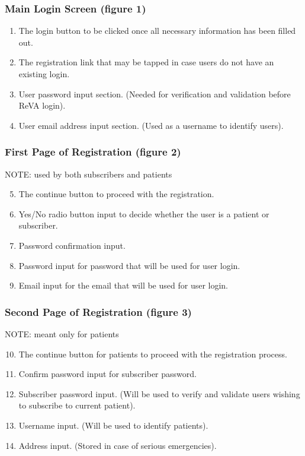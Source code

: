 \newpage
\pagebreak
\subsubsection{Main Login Screen (figure 1)}
\begin{enumerate}
   	\item The login button to be clicked once all necessary information has been filled out. 
   	\item The registration link that may be tapped in case users do not have an existing login. 
 	\item User password input section. (Needed for verification and validation before ReVA login). 
	\item User email address input section. (Used as a username to identify users). 
\end{enumerate}
\subsubsection{First Page of Registration (figure 2)}
NOTE: used by both subscribers and patients
\begin{enumerate}
\setcounter{enumi}{4}
	\item The continue button to proceed with the registration. 
	\item Yes/No radio button input to decide whether the user is a patient or subscriber. 
	\item Password confirmation input. 
	\item Password input for password that will be used for user login. 
	\item Email input for the email that will be used for user login. 
\end{enumerate}
\subsubsection{Second Page of Registration (figure 3)}
NOTE: meant only for patients
\begin{enumerate}
\setcounter{enumi}{9}
	\item The continue button for patients to proceed with the registration process. 
	\item Confirm password input for subscriber password. 
	\item Subscriber password input. (Will be used to verify and validate users wishing to subscribe to current patient). 
	\item Username input. (Will be used to identify patients). 
	\item Address input. (Stored in case of serious emergencies). 
\end{enumerate}
